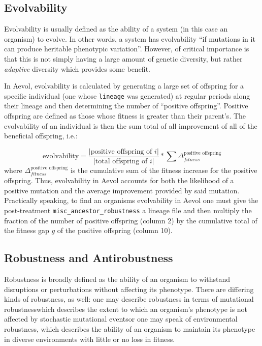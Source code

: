 \subsection{Evolvability}\label{subsec:evolvability}
Evolvability is usually defined as the ability of a system (in this case an organism) to evolve. In other words, a system has evolvability ``if mutations in it can produce heritable phenotypic variation''\cite{doi:10.1098/rspb.2007.1137}. However, of critical importance is that this is not simply having a large amount of genetic diversity, but rather \textit{adaptive} diversity which provides some benefit. 

In Aevol, evolvability is calculated by generating a large set of offspring for a specific individual (one whose \texttt{lineage} was generated) at regular periods along their lineage and then determining the number of ``positive offspring''. Positive offspring are defined as those whose fitness is greater than their parent's. The evolvability of an individual is then the sum total of all improvement of all of the beneficial offspring, i.e.:

\begin{equation*}
\text{evolvability} = \frac{|\text{positive offspring of }i|}{|\text{total offspring of }i|}*\sum \Delta^{\text{positive offspring}}_{fitness}
\end{equation*}  where $\Delta^{\text{positive offspring}}_{fitness}$ is the cumulative sum of the fitness increase for the positive offspring. Thus, evolvability in Aevol accounts for both the likelihood of a positive mutation and the average improvement provided by said mutation. Practically speaking, to find an organisms evolvability in Aevol one must give the post-treatment \texttt{misc\_ancestor\_robustness} a lineage file and then multiply the fraction of the number of positive offspring (column 2) by the cumulative total of the fitness gap $g$ of the positive offspring (column 10). 

\subsection{Robustness and Antirobustness}\label{subsec:robustness_antirobustness}
Robustness is broadly defined as the ability of an organism to withstand disruptions or perturbations without affecting its phenotype. There are differing kinds of robustness, as well: one may describe robustness in terms of mutational robustness\textendash which describes the extent to which an organism's phenotype is not affected by stochastic mutational events\textendash or one may speak of environmental robustness, which describes the ability of an organism to maintain its phenotype in diverse environments with little or no loss in fitness. 

